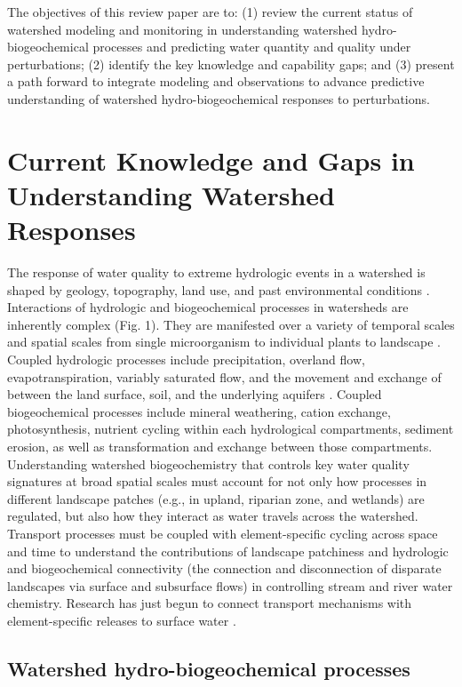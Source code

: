 \documentclass[preprint,review, 12pt]{elsarticle}
\begin{document}
The objectives of this review paper are to: (1) review the current status of watershed modeling and monitoring in understanding watershed hydro-biogeochemical processes and predicting water quantity and quality under perturbations; (2) identify the key knowledge and capability gaps; and (3) present a path forward to integrate modeling and observations to advance predictive understanding of watershed hydro-biogeochemical responses to perturbations.


\section{Current Knowledge and Gaps in Understanding Watershed Responses}

The response of water quality to extreme hydrologic events in a watershed is shaped by geology, topography, land use, and past environmental conditions \citep{Kaushal2018f,Kaushal2018g}. Interactions of hydrologic and biogeochemical processes in watersheds are inherently complex (Fig. 1). They are manifested over a variety of temporal scales and spatial scales from single microorganism to individual plants to landscape \citep{Wang2015}. Coupled hydrologic processes include precipitation, overland flow, evapotranspiration, variably saturated flow, and the movement and exchange of between the land surface, soil, and the underlying aquifers \citep{Yu2018}. Coupled biogeochemical processes include mineral weathering, cation exchange, photosynthesis, nutrient cycling within each hydrological compartments, sediment erosion, as well as transformation and exchange between those compartments. Understanding watershed biogeochemistry that controls key water quality signatures at broad spatial scales must account for not only how processes in different landscape patches (e.g., in upland, riparian zone, and wetlands) are regulated, but also how they interact as water travels across the watershed. Transport processes must be coupled with element-specific cycling across space and time to understand the contributions of landscape patchiness and hydrologic and biogeochemical connectivity (the connection and disconnection of disparate landscapes via surface and subsurface flows) in controlling stream and river water chemistry\citep{Harvey2015b}. Research has just begun to connect transport mechanisms with element-specific releases to surface water \citep{Bao2017b,Kaushal2018f}. 

\subsection{Watershed hydro-biogeochemical processes}
\end{document}
